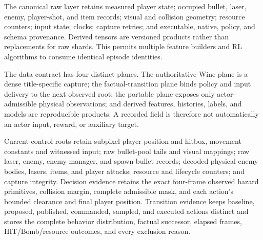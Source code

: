 \documentclass[11pt]{article}
\begin{document}
The canonical raw layer retains measured player state; occupied bullet, laser,
enemy, player-shot, and item records; visual and collision geometry; resource
counters; input state; clocks; capture retries; and executable, native,
policy, and schema provenance.  Derived tensors are versioned products rather
than replacements for raw shards.  This permits multiple feature builders and
RL algorithms to consume identical episode identities.

The data contract has four distinct planes.  The authoritative Wine plane is a
dense title-specific capture; the factual-transition plane binds policy and
input delivery to the next observed root; the portable plane exposes only
actor-admissible physical observations; and derived features, histories,
labels, and models are reproducible products.  A recorded field is therefore
not automatically an actor input, reward, or auxiliary target.

Current control roots retain subpixel player position and hitbox, movement
constants and witnessed input; raw bullet-pool tails and visual mappings; raw
laser, enemy, enemy-manager, and spawn-bullet records; decoded physical enemy
bodies, lasers, items, and player attacks; resource and lifecycle counters; and
capture integrity.  Decision evidence retains the exact four-frame observed
hazard primitives, collision margin, complete admissible mask, and each
action's bounded clearance and final player position.  Transition evidence
keeps baseline, proposed, published, commanded, sampled, and executed actions
distinct and stores the complete behavior distribution, factual successor,
elapsed frames, HIT/Bomb/resource outcomes, and every exclusion reason.
\end{document}
